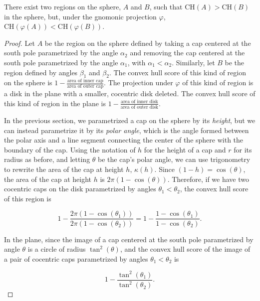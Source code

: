 \begin{lemma}
There exist two regions on the sphere, $A$ and $B$, such that $\mathrm{CH}(A) > \mathrm{CH}(B)$ in the sphere, but, under the gnomonic projection $\varphi$, $\mathrm{CH}(\varphi(A))<\mathrm{CH}(\varphi(B))$.
\end{lemma}
\begin{proof}

Let $A$ be the region on the sphere defined by taking a cap centered at the south pole parametrized by the angle $\alpha_2$ and removing the cap centered at the south pole parametrized by the angle $\alpha_1$, with $\alpha_1<\alpha_2$.  Similarly, let $B$ be the region defined by angles $\beta_1$ and $\beta_2$.  The convex hull score of this kind of region on the sphere is $1-\frac{\text{area of inner cap}}{\text{area of outer cap}}$.  The projection under $\varphi$ of this kind of region is a disk in the plane with a smaller, cocentric disk deleted.  The convex hull score of this kind of region in the plane is $1-\frac{\text{area of inner disk}}{\text{area of outer disk}}$.  

In the previous section, we parametrized a cap on the sphere by its \textit{height}, but we can instead parametrize it by its \textit{polar angle}, which is the angle formed between the polar axis and a line segment connecting the center of the sphere with the boundary of the cap.  Using the notation of $h$ for the height of a cap and $r$ for its radius as before, and letting $\theta$ be the cap's polar angle, we can use trigonometry to rewrite the area of the cap at height $h$, $\kappa(h)$.  Since $(1-h)=\cos(\theta)$, the area of the cap at height $h$ is $2\pi (1-\cos(\theta))$.  Therefore, if we have two cocentric caps on the disk parametrized by angles $\theta_1<\theta_2$, the convex hull score of this region is 

$$1-\frac{2\pi (1-\cos(\theta_1))}{2\pi (1-\cos(\theta_2))} = 1-\frac{1-\cos(\theta_1)}{1-\cos(\theta_2)}.$$

In the plane, since the image of a cap centered at the south pole parametrized by angle $\theta$ is a circle of radius $\tan^2(\theta)$, and the convex hull score of the image of a pair of cocentric caps parametrized by angles $\theta_1<\theta_2$ is

$$  1-\frac{\tan^2(\theta_1)}{\tan^2(\theta_2)}.  $$



\end{proof}
